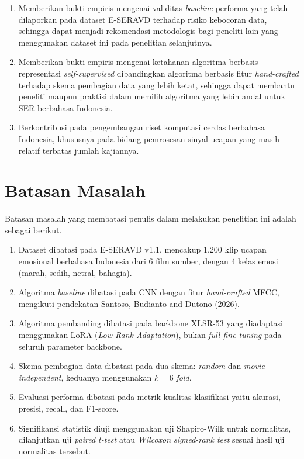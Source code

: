 \begin{enumerate}
  \item Memberikan bukti empiris mengenai validitas \emph{baseline}
        performa yang telah dilaporkan pada dataset E-SERAVD terhadap
        risiko kebocoran data, sehingga dapat menjadi rekomendasi
        metodologis bagi peneliti lain yang menggunakan dataset ini
        pada penelitian selanjutnya.
  \item Memberikan bukti empiris mengenai ketahanan algoritma berbasis
        representasi \emph{self-supervised} dibandingkan algoritma berbasis fitur
        \emph{hand-crafted} terhadap skema pembagian data yang lebih ketat, sehingga
        dapat membantu peneliti maupun praktisi dalam memilih algoritma
        yang lebih andal untuk SER berbahasa Indonesia.
  \item Berkontribusi pada pengembangan riset komputasi cerdas berbahasa
        Indonesia, khususnya pada bidang pemrosesan sinyal ucapan yang
        masih relatif terbatas jumlah kajiannya.
\end{enumerate}

\section{Batasan Masalah}
\label{sec:1.5}

Batasan masalah yang membatasi penulis dalam melakukan penelitian ini
adalah sebagai berikut.

\begin{enumerate}
  \item Dataset dibatasi pada E-SERAVD v1.1, mencakup 1.200 klip ucapan
        emosional berbahasa Indonesia dari 6 film sumber, dengan 4
        kelas emosi (marah, sedih, netral, bahagia).
  \item Algoritma \emph{baseline} dibatasi pada CNN dengan fitur \emph{hand-crafted}
        MFCC, mengikuti pendekatan Santoso, Budianto and Dutono (2026).
  \item Algoritma pembanding dibatasi pada backbone XLSR-53 yang diadaptasi
        menggunakan LoRA (\emph{Low-Rank Adaptation}), bukan
        \emph{full fine-tuning} pada seluruh parameter backbone.
  \item Skema pembagian data dibatasi pada dua skema: \emph{random} dan
        \emph{movie-independent}, keduanya menggunakan $k=6$
        \emph{fold}.
  \item Evaluasi performa dibatasi pada metrik kualitas klasifikasi yaitu
        akurasi, presisi, recall, dan F1-score.
  \item Signifikansi statistik diuji menggunakan uji Shapiro-Wilk untuk
        normalitas, dilanjutkan uji \emph{paired t-test} atau
        \emph{Wilcoxon signed-rank test} sesuai hasil uji normalitas
        tersebut.
\end{enumerate}

